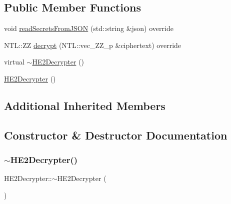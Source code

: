 \subsection*{Public Member Functions}
\begin{DoxyCompactItemize}
\item 
void \hyperlink{classHE2Decrypter_a9cf1a6eae2667f6e891237589c4eeda0}{read\+Secrets\+From\+J\+S\+ON} (std\+::string \&json) override
\item 
N\+T\+L\+::\+ZZ \hyperlink{classHE2Decrypter_a766f96cb2277fd3e4af59ca44a32d519}{decrypt} (N\+T\+L\+::vec\+\_\+\+Z\+Z\+\_\+p \&ciphertext) override
\item 
virtual \hyperlink{classHE2Decrypter_a123b17b00516da42e87d7fa7d7911613}{$\sim$\+H\+E2\+Decrypter} ()
\item 
\hyperlink{classHE2Decrypter_a9ccbcb4de6bae54641e8777f9288d3f9}{H\+E2\+Decrypter} ()
\end{DoxyCompactItemize}
\subsection*{Additional Inherited Members}


\subsection{Constructor \& Destructor Documentation}
\mbox{\label{classHE2Decrypter_a123b17b00516da42e87d7fa7d7911613}} 
\subsubsection{\texorpdfstring{$\sim$\+H\+E2\+Decrypter()}{~HE2Decrypter()}}
{\footnotesize\ttfamily H\+E2\+Decrypter\+::$\sim$\+H\+E2\+Decrypter (\begin{DoxyParamCaption}{ }\end{DoxyParamCaption})\hspace{0.3cm}{\ttfamily [virtual]}}

\mbox{\label{classHE2Decrypter_a9ccbcb4de6bae54641e8777f9288d3f9}} 
